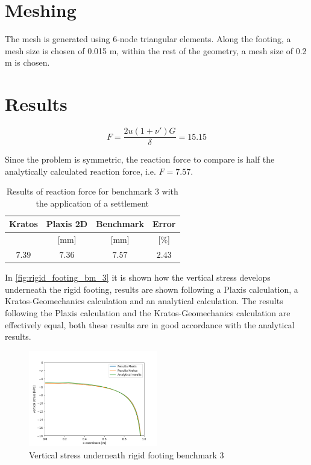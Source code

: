 \documentclass{deltares_manual_style}
\begin{document}
\section{Meshing}

The mesh is generated using 6-node triangular elements. Along the footing, a mesh size is chosen of 0.015 m, within the rest of the geometry, a mesh size of 0.2 m is chosen.

\section{Results}


\begin{equation}\label{eq:reaction_force_analytical}
F = \frac{2u(1+\nu')G}{\delta} = 15.15
\end{equation}

Since the problem is symmetric, the reaction force to compare is half the analytically calculated reaction force, i.e. $F=7.57$. 


\begin{table}[H]
	\caption{Results of reaction force for benchmark 3 with the application of a settlement }
	\label{tab:Resultsbm3}
	\centering
	\begin{tabular}{|c|c|c|c|}
		\hline
		Kratos & Plaxis 2D &Benchmark & Error\\ \hline
		[mm] & [mm] & [mm] & [\%] \\ \hline  
		$7.39$ & $7.36$ & $7.57$ & $2.43$ \\ \hline
	\end{tabular}
\end{table}


In \autoref{fig:rigid_footing_bm_3}  it is shown how the vertical stress develops underneath the rigid footing, results are shown following a Plaxis calculation, a Kratos-Geomechanics calculation and an analytical calculation. The results following the Plaxis calculation and the Kratos-Geomechanics calculation are effectively equal, both these results are in good accordance with the analytical results.

\begin{figure}[h]
	\centering
	\includegraphics[width=0.50\textwidth]{figures/vertical_stress_rigid_footing_elastic_soil.png}
	\caption{Vertical stress underneath rigid footing benchmark 3}
	\label{fig:rigid_footing_bm_3}
\end{figure}
\end{document}
